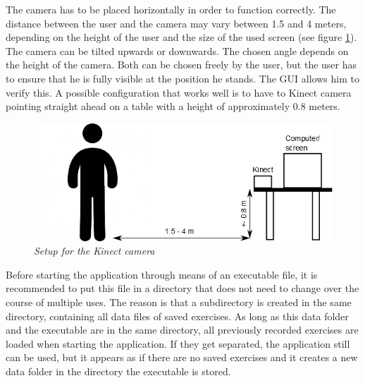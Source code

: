 The camera has to be placed horizontally in order to function correctly. The distance between the user and the camera may vary between 1.5 and 4 meters, depending on the height of the user and the size of the used screen (see figure \ref{fig: kinect_setup}). The camera can be tilted upwards or downwards. The chosen angle depends on the height of the camera. Both can be chosen freely by the user, but the user has to ensure that he is fully visible at the position he stands. The GUI allows him to verify this. A possible configuration that works well is to have to Kinect camera pointing straight ahead on a table with a height of approximately 0.8 meters.\\

\begin{figure}[H]
\begin{center}
\includegraphics[width=12cm]{SetupKinect.png}
\caption{\emph{Setup for the Kinect camera}}
\label{fig: kinect_setup}
\end{center}
\end{figure}

Before starting the application through means of an executable file, it is recommended to put this file in a directory that does not need to change over the course of multiple uses. The reason is that a subdirectory is created in the same directory, containing all data files of saved exercises. As long as this data folder and the executable are in the same directory, all previously recorded exercises are loaded when starting the application. If they get separated, the application still can be used, but it appears as if there are no saved exercises and it creates a new data folder in the directory the executable is stored.\\

